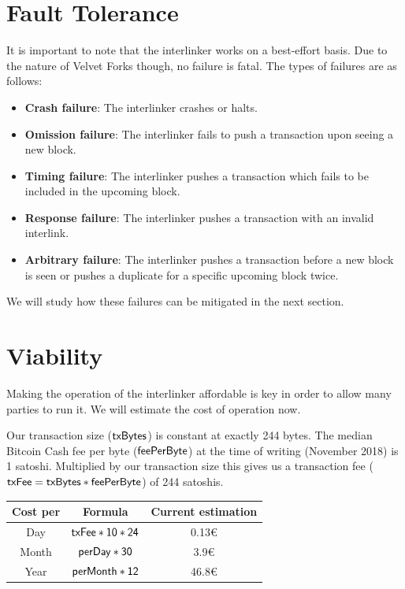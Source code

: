 \section{Fault Tolerance}
It is important to note that the interlinker works on a best-effort basis. Due to the nature of Velvet Forks though, no failure is fatal. The types of failures are as follows:

\begin{itemize}
  \item \textbf{Crash failure}: The interlinker crashes or halts.
  \item \textbf{Omission failure}: The interlinker fails to push a transaction upon seeing a new block.
  \item \textbf{Timing failure}: The interlinker pushes a transaction which fails to be included in the upcoming block.
  \item \textbf{Response failure}: The interlinker pushes a transaction with an invalid interlink.
  \item \textbf{Arbitrary failure}: The interlinker pushes a transaction before a new block is seen or pushes a duplicate for a specific upcoming block twice.
\end{itemize}

We will study how these failures can be mitigated in the next section.

\section{Viability}
Making the operation of the interlinker affordable is key in order to allow many parties to run it. We will estimate the cost of operation now.

Our transaction size ($\sf txBytes$) is constant at exactly 244 bytes. The median Bitcoin Cash fee per byte ($\sf feePerByte$) at the time of writing (November 2018) is 1 satoshi. Multiplied by our transaction size this gives us a transaction fee ($\sf txFee = txBytes * feePerByte$) of 244 satoshis.

\begin{table}
  \centering
  \begin{tabular}{|c|c|c|}
    \hline
    Cost per & Formula & Current estimation \\
    \hline
    Day & $\sf txFee * 10 * 24$ & 0.13€ \\
    Month & $\sf perDay * 30$ & 3.9€ \\
    Year & $\sf perMonth * 12$ & 46.8€ \\
    \hline
  \end{tabular}
\end{table}

